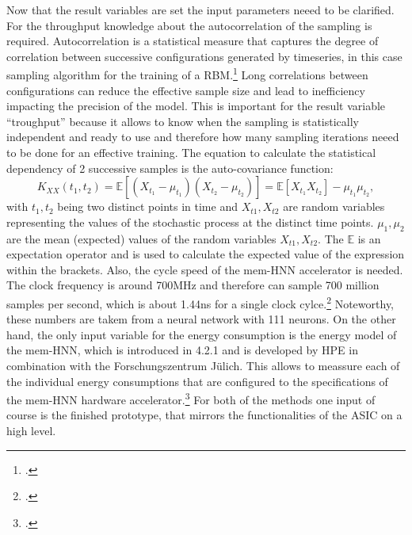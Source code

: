 Now that the result variables are set the input parameters neeed to be clarified. 
For the throughput knowledge about the autocorrelation of the sampling is required.
Autocorrelation is a statistical measure that captures the degree of correlation between successive configurations generated by timeseries, in this case sampling algorithm for the training of a \ac{RBM}.\footcite[cf.][1-6]{tanakaReductionAutocorrelationHMC2017}
Long correlations between configurations can reduce the effective sample size and lead to inefficiency impacting the precision of the model.
This is important for the result variable ``troughput'' because it allows to know when the sampling is statistically independent and ready to use and therefore how many sampling iterations neeed to be done for an effective training. 
The equation to calculate the statistical dependency of 2 successive samples is the auto-covariance function: 
\begin{equation}
    K_{XX}(t_1, t_2) = \mathbb{E}[(X_{t_1} - \mu_{t_1})(X_{t_2} - \mu_{t_2})] = \mathbb{E}[X_{t_1} X_{t_2}] - \mu_{t_1}\mu_{t_2},
\end{equation}
with \(t_1,t_2\) being two distinct points in time and \(X_{t1},X_{t2}\) are random variables representing the values of the stochastic process at the distinct time points. 
\(\mu_1,\mu_2\) are the mean (expected) values of the random variables \(X_{t1},X_{t2}\). 
The \(\mathbb{E}\) is an expectation operator and is used to calculate the expected value of the expression within the brackets.
Also, the cycle speed of the \ac{mem-HNN} accelerator is needed. 
The clock frequency is around 700MHz and therefore can sample 700 million samples per second, which is about 1.44ns for a single clock cylce.\footcite[cf. table1][7-8]{caiPowerefficientCombinatorialOptimization2020} 
Noteworthy, these numbers are takem from a neural network with 111 neurons. 
On the other hand, the only input variable for the energy consumption is the energy model of the \ac{mem-HNN}, which is introduced in 4.2.1 and is developed by HPE in combination with the Forschungszentrum Jülich.
This allows to meassure each of the individual energy consumptions that are configured to the specifications of the \ac{mem-HNN} hardware accelerator.\footcite[cf.][1-5]{hizzaniMemristorbasedHardwareAlgorithms2023}
For both of the methods one input of course is the finished prototype, that mirrors the functionalities of the \ac{ASIC} on a high level.


